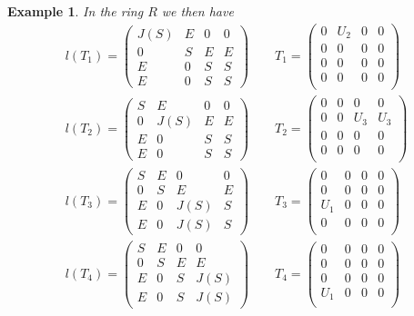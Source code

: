 \documentclass[11pt]{article}
\theoremstyle{plain}
\newtheorem{Ex}[veta]{Example}
\theoremstyle{remark}
\theoremstyle{plain}
\begin{document}
\begin{Ex}
In the ring $R$ we then have
\begin{gather*}
    l(T_1)=\begin{pmatrix}
    J(S)&E&0&0\\
    0&S&E&E\\
E&0&S&S\\
E&0&S&S
\end{pmatrix} \qquad T_1=\begin{pmatrix}
        0&U_2&0&0\\
        0&0&0&0\\
        0&0&0&0\\
        0&0&0&0\\
    \end{pmatrix}\\[1ex]
    l(T_2)=\begin{pmatrix}
    S&E&0&0\\
    0&J(S)&E&E\\
E&0&S&S\\
E&0&S&S
\end{pmatrix} \qquad T_2=\begin{pmatrix}
        0&0&0&0\\
        0&0&U_3&U_3\\
        0&0&0&0\\
        0&0&0&0\\
    \end{pmatrix}\\[1ex] %
    l(T_3)=\begin{pmatrix}
    S&E&0&0\\
    0&S&E&E\\
E&0&J(S)&S\\
E&0&J(S)&S
\end{pmatrix} \qquad T_3=\begin{pmatrix}
        0&0&0&0\\
        0&0&0&0\\
        U_1&0&0&0\\
        0&0&0&0\\
    \end{pmatrix}\\[1ex]
    l(T_4)=\begin{pmatrix}
    S&E&0&0\\
    0&S&E&E\\
E&0&S&J(S)\\
E&0&S&J(S)
\end{pmatrix} \qquad T_4=\begin{pmatrix}
        0&0&0&0\\
        0&0&0&0\\
        0&0&0&0\\
        U_1&0&0&0\\
    \end{pmatrix}
\end{gather*}
\end{Ex}
\end{document}
